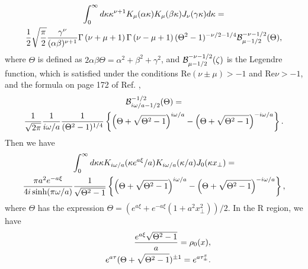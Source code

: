 \documentclass[aps,prd,preprintnumbers,nofootinbib,showpacs,11pt]{revtex4}%
\begin{document}
\begin{widetext}
\begin{multline}
\int_{0}^\infty d\kappa\kappa^{\nu+1}K_\mu(\alpha\kappa)K_\mu(\beta\kappa)J_\nu(\gamma \kappa) d\kappa
= \\
{1\over 2}\sqrt{\pi\over 2}{\gamma^\nu\over (\alpha\beta)^{\nu+1}}
\Gamma\left({\nu+\mu+1}\right)\Gamma\left({\nu-\mu+1}\right)(\Theta^2-1)^{-\nu/2-1/4}{\cal B}_{\mu-1/2}^{-\nu-1/2}(\Theta),
\nonumber\\
\end{multline}
where $\Theta$ is defined as $2\alpha\beta\Theta={\alpha^2+\beta^2+\gamma^2}$, and 
${\cal B}_{\mu-1/2}^{-\nu-1/2}(\zeta)$ is the Legendre function, 
which is satisfied under the conditions Re$(\nu\pm\mu)>-1$ and Re$\nu>-1$, 
and the formula on page 172 of Ref. \cite{Magnus}, 
\begin{multline}
{\cal B}_{i\omega/a-1/2}^{-1/2}(\Theta)=\\
{1\over \sqrt{2\pi}}{1\over i\omega/a}{1\over (\Theta^2-1)^{1/4}}
\left\{\left(\Theta+\sqrt{\Theta^2-1}\right)^{i\omega/a}-\left(\Theta+\sqrt{\Theta^2-1}\right)^{-i\omega/a}\right\}.
\end{multline}
Then we have
\begin{multline}
\int_0^\infty d\kappa\kappa
K_{i\omega/a}(\kappa e^{a\xi}/a) K_{i\omega/a}(\kappa/a) J_0(\kappa x_\perp) =\\
{ \pi a^2 e^{-a\xi} 
 \over 4i\sinh (\pi\omega/a)} {1\over \sqrt {\Theta^2-1}}
\left\{\left(\Theta+\sqrt{\Theta^2-1}\right)^{i\omega/a}-\left(\Theta+\sqrt{\Theta^2-1}\right)^{-i\omega/a}\right\},
\label{KKJ}
\end{multline}
where $\Theta$ has the expression $\Theta={(e^{a\xi}+e^{-a\xi}(1+a^2 x_\perp^2))/ 2}$. 
In the R region, we have
\begin{eqnarray}
&&{e^{a\xi}\sqrt{\Theta^2-1}\over a}= \rho_0(x),
\\
&&e^{a\tau}(\Theta+\sqrt{\Theta^2-1})^{\pm1} =e^{a\tau_\pm^x}.

\end{eqnarray}
\end{widetext}
\end{document}

